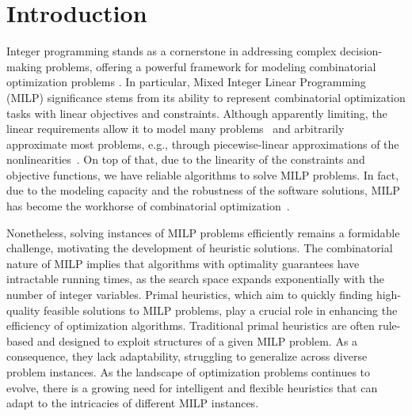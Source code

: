 \chapter*{Introduction}\label{chap:intro}

Integer programming stands as a cornerstone in addressing complex decision-making problems, offering a powerful framework for modeling combinatorial optimization problems \cite{wolseyFormulations2020}.
In particular, Mixed Integer Linear Programming (MILP) significance stems from its ability to represent combinatorial optimization tasks with linear objectives and constraints.
Although apparently limiting, the linear requirements allow it to model many problems~\cite{nemhauserScopeIntegerCombinatorial1988} and arbitrarily approximate most problems, e.g., through piecewise-linear approximations of the nonlinearities~\cite{camponogaraModelsAlgorithmsOptimal2015}.
On top of that, due to the linearity of the constraints and objective functions, we have reliable algorithms to solve MILP problems.
In fact, due to the modeling capacity and the robustness of the software solutions, MILP has become the workhorse of combinatorial optimization~\cite{bengioMachineLearningCombinatorial2021}.

Nonetheless, solving instances of MILP problems efficiently remains a formidable challenge, motivating the development of heuristic solutions.
The combinatorial nature of MILP implies that algorithms with optimality guarantees have intractable running times, as the search space expands exponentially with the number of integer variables.
Primal heuristics, which aim to quickly finding high-quality feasible solutions to MILP problems, play a crucial role in enhancing the efficiency of optimization algorithms.
Traditional primal heuristics are often rule-based and designed to exploit structures of a given MILP problem.
As a consequence, they lack adaptability, struggling to generalize across diverse problem instances.
As the landscape of optimization problems continues to evolve, there is a growing need for intelligent and flexible heuristics that can adapt to the intricacies of different MILP instances.


